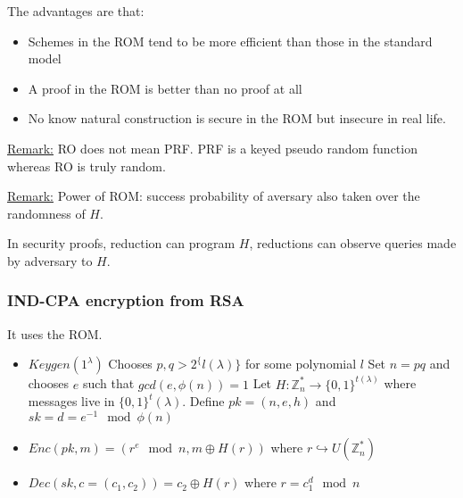 \documentclass{article}
\newcommand{\Rem}{\underline{Remark:} }
\newcommand{\Z}{\mathbb{Z}}
\newcommand{\bit}{\{0,1\}}
\begin{document}
The advantages are that:
\begin{itemize}
\item Schemes in the ROM tend to be more efficient than those in the standard model
\item A proof in the ROM is better than no proof at all
\item No know natural construction is secure in the ROM but insecure in real life.
\end{itemize}

\Rem RO does not mean PRF. PRF is a keyed pseudo random function whereas RO is truly random.

\Rem Power of ROM: success probability of aversary also taken over the randomness of $H$.

In security proofs, reduction can program $H$, reductions can observe queries made by adversary to $H$.

\subsubsection{IND-CPA encryption from RSA}
It uses the ROM.

\begin{itemize}
\item $Keygen(1^\lambda)$
\subitem Chooses $p,q>2^\{l(\lambda)\}$ for some polynomial $l$
\subitem Set $n=pq$ and chooses $e$ such that $gcd(e,\phi(n))=1$
\subitem Let $H:\Z_n^*\rightarrow\bit^{t(\lambda)}$ where messages live in $\bit^t(\lambda)$.
\subitem Define $pk=(n,e,h)$ and $sk=d=e^{-1}\mod{\phi(n)}$
\item $Enc(pk,m)=(r^e\mod{n},m\oplus H(r))$ where $r\hookrightarrow U(\Z_n^*)$
\item $Dec(sk,c=(c_1,c_2))=c_2\oplus H(r)$ where $r=c_1^d\mod{n}$
\end{itemize}
\end{document}
